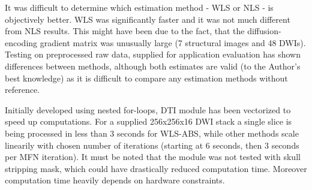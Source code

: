 It was difficult to determine which estimation method - WLS or NLS - is objectively better. WLS was significantly faster and it was not much different from NLS results. This might have been due to the fact, that the diffusion-encoding gradient matrix was unusually large (7 structural images and 48 DWIs). Testing on preprocessed raw data, supplied for application evaluation has shown differences between methods, although both estimates are valid (to the Author's best knowledge) as it is difficult to compare any estimation methods without reference.

Initially developed using nested for-loops, DTI module has been vectorized to speed up computations. For a supplied 256x256x16 DWI stack a single slice is being processed in less than 3 seconds for WLS-ABS, while other methods scale linearily with chosen number of iterations (starting at 6 seconds, then 3 seconds per MFN iteration). It must be noted that the module was not tested with skull stripping mask, which could have drastically reduced computation time. Moreover computation time heavily depends on hardware constraints.